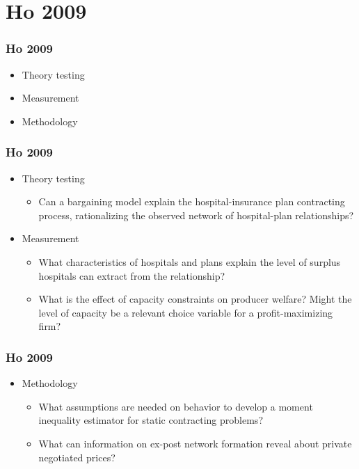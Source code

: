 \documentclass[xcolor=pdftex,dvipsnames,table,mathserif]{beamer}
\begin{document}
\section{Ho 2009}

\begin{frame}
\frametitle{Ho 2009}

\begin{itemize}
	\item Theory testing
	\item Measurement
	\item Methodology
\end{itemize}
\end{frame}


\begin{frame}
\frametitle{Ho 2009}

\begin{itemize}
	\item Theory testing
         \begin{itemize}
	\item Can a bargaining model explain the hospital-insurance plan contracting process, rationalizing the observed network of hospital-plan relationships? 	\end{itemize}
	\item Measurement
	\begin{itemize}
	\item What characteristics of hospitals and plans explain the level of surplus hospitals can extract from the relationship?
	\item What is the effect of capacity constraints on producer welfare?  Might the level of capacity be a relevant choice variable for a profit-maximizing firm?
	\end{itemize}
\end{itemize}
\end{frame}


\begin{frame}
\frametitle{Ho 2009}

\begin{itemize}
	\item Methodology
	\begin{itemize}
	\item What assumptions are needed on behavior to develop a moment inequality estimator for static contracting problems?
	\item What can information on ex-post network formation reveal about private negotiated prices?
	\end{itemize}
\end{itemize}
\end{frame}
\end{document}

